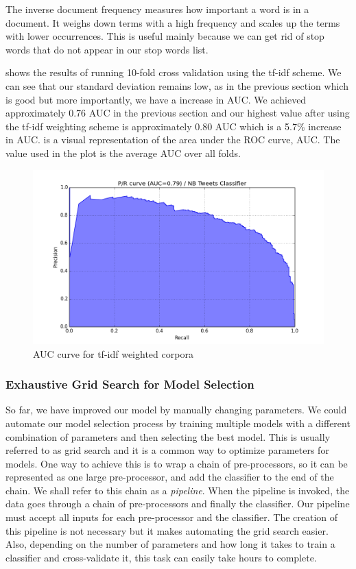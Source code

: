 The inverse document frequency measures how important a word is in a document. It weighs down terms
with a high frequency and scales up the terms with lower occurrences. This is useful mainly
because we can get rid of stop words that do not appear in our stop words list.

 shows the results of running 10-fold cross validation using the
tf-idf scheme. We can see that our standard deviation remains low, as in the previous section which
is good but more importantly, we have a increase in AUC\@. We achieved approximately 0.76 AUC in the
previous section and our highest value after using the tf-idf weighting scheme is approximately 0.80
AUC which is a 5.7\% increase in AUC\@.  is a visual representation of the
area under the ROC curve, AUC\@. The value used in the plot is the average AUC over all folds.

\begin{figure}
  \includegraphics[scale=0.65]{Figures/pr_NB_Tweets_Classifier_03}
\caption{AUC curve for tf-idf weighted corpora}
\label{fig:auc-tfidf}
\end{figure}



\subsubsection{Exhaustive Grid Search for Model Selection}
\label{sec:exhaustive-grid-search}
So far, we have improved our model by manually changing parameters. We could automate our model
selection process by training multiple models with a different combination of parameters and then
selecting the best model. This is usually referred to as grid search and it is a common way to
optimize parameters for models. One way to achieve this is to wrap a chain of pre-processors, so it
can be represented as one large pre-processor, and add the classifier to the end of the chain. We
shall refer to this chain as a \textit{pipeline}. When the pipeline is invoked, the data goes
through a chain of pre-processors and finally the classifier. Our pipeline must accept all inputs
for each pre-processor and the classifier. The creation of this pipeline is not necessary but it
makes automating the grid search easier. Also, depending on the number of parameters and how long it
takes to train a classifier and cross-validate it, this task can easily take hours to complete.

